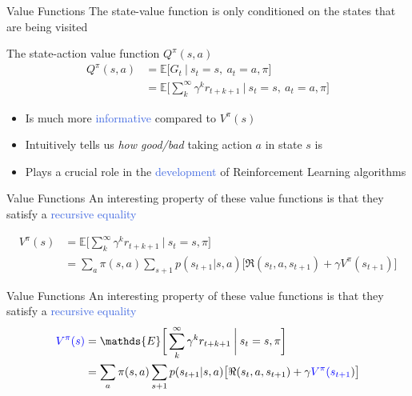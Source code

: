 \documentclass{beamer}
\begin{document}
\begin{frame}{Value Functions}
	The state-value function is only conditioned on the states that are being visited
	
	\begin{block}{The state-action value function $Q^{\pi}(s,a)$}
		\begin{align*}
		Q^{\pi}(s,a) & = \mathds{E} \bigg[G_t \: \big| \: s_t=s, \: a_t=a,  \pi \bigg] \\ 
			& = \mathds{E} \bigg[\sum_{k}^{\infty}\gamma^{k} r_{t+k+1} \: \bigg| \: s_t=s, \: a_t=a, \pi \bigg]
		\end{align*}
	\end{block}

	\begin{itemize}
		\item Is much more \textcolor{RoyalBlue}{informative} compared to $V^{\pi}(s)$
		\item Intuitively tells us \textit{how good/bad} taking action $a$ in state $s$ is
		\item Plays a crucial role in the \textcolor{RoyalBlue}{development} of Reinforcement Learning algorithms
	\end{itemize}

\end{frame}

\begin{frame}{Value Functions}
	An interesting property of these value functions is that they satisfy a \textcolor{RoyalBlue}{recursive equality}

		\begin{align*}
			V^{\pi}(s) & = \mathds{E} \bigg[\sum_{k}^{\infty}\gamma^{k} r_{t+k+1} \: \bigg| \: s_t=s,\pi \bigg] \\
			   & = \sum_a \pi(s,a) \sum_{s+1} p(s_{t+1}|s,a)\big[\Re(s_t, a, s_{t+1}) + \gamma V^{\pi}(s_{t+1}) \big] 
		\end{align*}
\end{frame}


\begin{frame}{Value Functions}
	An interesting property of these value functions is that they satisfy a \textcolor{RoyalBlue}{recursive equality}
		\begin{align*}
			\textcolor{blue}{V^{\pi}(s)} & = \mathds{E} \bigg[\sum_{k}^{\infty}\gamma^{k} r_{t+k+1} \: \bigg| \: s_t=s,\pi \bigg] \\
			   & = \sum_a \pi(s,a) \sum_{s+1} p(s_{t+1}|s,a)\big[\Re(s_t, a, s_{t+1}) + \gamma \textcolor{blue}{V^{\pi}(s_{t+1}}) \big] 
		\end{align*}
\end{frame}
\end{document}
